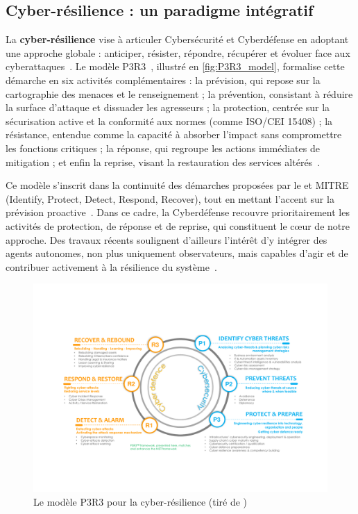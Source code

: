 \subsection*{Cyber-résilience : un paradigme intégratif}

La \textbf{cyber-résilience} vise à articuler Cybersécurité et Cyberdéfense en adoptant une approche globale : anticiper, résister, répondre, récupérer et évoluer face aux cyberattaques~\cite{NISTresilience}. Le modèle P3R3~\cite{Theron2013P3R3}, illustré en \autoref{fig:P3R3_model}, formalise cette démarche en six activités complémentaires : la prévision, qui repose sur la cartographie des menaces et le renseignement ; la prévention, consistant à réduire la surface d'attaque et dissuader les agresseurs ; la protection, centrée sur la sécurisation active et la conformité aux normes (comme ISO/CEI 15408) ; la résistance, entendue comme la capacité à absorber l'impact sans compromettre les fonctions critiques ; la réponse, qui regroupe les actions immédiates de mitigation ; et enfin la reprise, visant la restauration des services altérés~\cite{Theron2013P3R3}.

Ce modèle s'inscrit dans la continuité des démarches proposées par le  et MITRE (Identify, Protect, Detect, Respond, Recover), tout en mettant l'accent sur la prévision proactive~\cite{Theron2013P3R3}. Dans ce cadre, la Cyberdéfense recouvre prioritairement les activités de protection, de réponse et de reprise, qui constituent le cœur de notre approche. Des travaux récents soulignent d'ailleurs l'intérêt d'y intégrer des agents autonomes, non plus uniquement observateurs, mais capables d'agir et de contribuer activement à la résilience du système~\cite{Kott2023}.

\begin{figure}[h]
    \centering
    \includegraphics[width=\linewidth]{figures/P3R3.pdf}
    \caption{Le modèle P3R3 pour la cyber-résilience (tiré de \autocite{Kott2023})}
    \label{fig:P3R3_model}
\end{figure}

